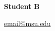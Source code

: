

%


% 

\noindent  \LARGE{\textbf{Student B}} %

\normalsize
\noindent \href{mailto:email@msu.edu}{email@msu.edu}

\noindent\hrulefill
\vspace{1em}

